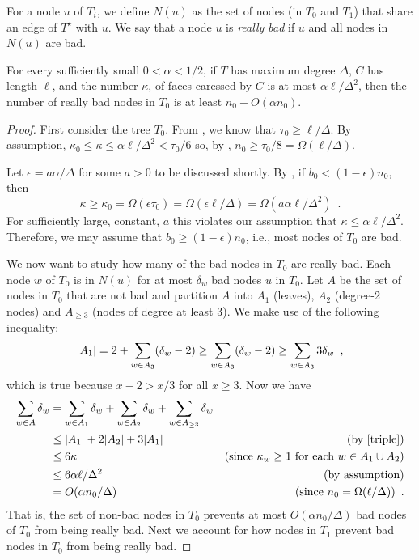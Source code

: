 \documentclass{patmorin}
\newcommand{\dual}[1]{{#1}^\star}
\begin{document}
For a node $u$ of $T_i$, we define $N(u)$ as the set of nodes (in $T_0$
and $T_1$) that share an edge of $\dual{T}$ with $u$.  We say that a
node $u$ is \emph{really bad} if $u$ and all nodes in $N(u)$ are bad.

\begin{lem}
  For every sufficiently small $0<\alpha < 1/2$,  
  if $T$ has maximum degree $\Delta$, $C$ has length $\ell$, and the number
  $\kappa$, of faces caressed by $C$ is at most $\alpha\ell/\Delta^2$, then
  the number of really bad nodes in $T_0$ is at least $n_0-O(\alpha n_0)$.
\end{lem}

\begin{proof}
  First consider the tree $T_0$.  From ,
  we know that $\tau_0\ge \ell/\Delta$.  By assumption,
  $\kappa_0\le\kappa\le \alpha\ell/\Delta^2 < \tau_0/6$
  so, by , $n_0 \ge
  \tau_0/8=\Omega(\ell/\Delta)$.
  
  Let $\epsilon=a\alpha/\Delta$ for some $a>0$ to be discussed shortly.
  By , if $b_0 < (1-\epsilon) n_0$, then
  \[ 
      \kappa \ge \kappa_0 = \Omega(\epsilon\tau_0)
               = \Omega(\epsilon\ell/\Delta)
               = \Omega(a\alpha\ell/\Delta^2) 
               \enspace .
  \]
  For sufficiently large, constant, $a$ this violates our assumption
  that $\kappa \le \alpha\ell/\Delta^2$.
  Therefore, we may assume that $b_0\ge (1-\epsilon)n_0$, i.e., most nodes
  of $T_0$ are bad.

  We now want to study how many of the bad nodes in $T_0$ are really bad.
  Each node $w$ of $T_0$ is in $N(u)$ for at most $\delta_w$ bad nodes
  $u$ in $T_0$.  Let $A$ be the set of nodes in $T_0$ that are not
  bad and partition $A$ into $A_1$ (leaves), $A_2$ (degree-2 nodes)
  and $A_{\ge 3}$ (nodes of degree at least 3).  We make use of the
  following inequality:
	\begin{equation}
		|A_1| = 2 + \sum_{w\in A_3}(\delta_w-2) \ge \sum_{w\in A_3}(\delta_w-2)
		\ge \sum_{w\in A_3}3\delta_w \enspace ,  \eqlabel{triple}
	\end{equation}
  which is true because $x-2>x/3$ for all $x\ge 3$. 
  Now we have 
  \begin{align*}
   \sum_{w\in A}\delta_w 
    & = \sum_{w\in A_1}\delta_w 
         + \sum_{w\in A_2}\delta_w 
         + \sum_{w\in A_{\ge 3}}\delta_w \\
	  & \le |A_1| + 2|A_2| + 3|A_1| & \text{(by \eqref{triple})}\\
    & \le 6\kappa & \text{(since $\kappa_w\ge 1$ for each $w\in A_1\cup A_2$)}\\
    & \le 6\alpha\ell/\Delta^2 & \text{(by assumption)}\\
    & = O(\alpha n_0/\Delta) & \text{(since $n_0=\Omega(\ell/\Delta)$)}\enspace .
  \end{align*}
  That is, the set of non-bad nodes in $T_0$ prevents at most $O(\alpha
  n_0/\Delta)$ bad nodes of $T_0$ from being really bad. Next we account
  for how nodes in $T_1$ prevent bad nodes in $T_0$ from being really bad.


\end{proof}
\end{document}
